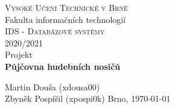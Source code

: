 \documentclass{article}
\begin{document}
\clearpage
\begin{titlepage}
	\begin{center}
		\textsc{\LARGE Vysoké Učení Technické v Brně}\\[0.5cm]
		{\LARGE Fakulta informačních technologií }\\[4.0cm]

		\textsc{\LARGE IDS - Databázové systémy}\\[0.5cm]
		\textsc{\LARGE 2020/2021}\\[3.5cm]

		{\LARGE Projekt}\\[0.5cm]
    {\LARGE \textbf{Půjčovna hudebních nosičů}}\\
	\end{center}

	\vfill 

	\begin{flushleft} 
		\large
		Martin Douša (xdousa00)\\
    Zbyněk Pospíšil (xpospi0k)
		\hfill
		Brno, \today
	\end{flushleft}
\end{titlepage}
\thispagestyle{empty}

\newpage
\tableofcontents

\newpage
\listoffigures

\newpage


\end{document}
